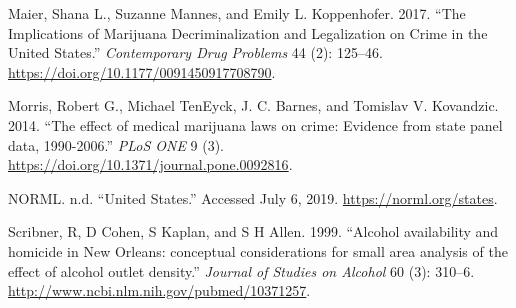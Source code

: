 \documentclass[11pt,]{article}
\begin{document}
\leavevmode\hypertarget{ref-Maier2017}{}%
Maier, Shana L., Suzanne Mannes, and Emily L. Koppenhofer. 2017. ``The
Implications of Marijuana Decriminalization and Legalization on Crime in
the United States.'' \emph{Contemporary Drug Problems} 44 (2): 125--46.
\url{https://doi.org/10.1177/0091450917708790}.

\leavevmode\hypertarget{ref-Morris2014}{}%
Morris, Robert G., Michael TenEyck, J. C. Barnes, and Tomislav V.
Kovandzic. 2014. ``The effect of medical marijuana laws on crime:
Evidence from state panel data, 1990-2006.'' \emph{PLoS ONE} 9 (3).
\url{https://doi.org/10.1371/journal.pone.0092816}.

\leavevmode\hypertarget{ref-NORML}{}%
NORML. n.d. ``United States.'' Accessed July 6, 2019.
\url{https://norml.org/states}.

\leavevmode\hypertarget{ref-Scribner1999}{}%
Scribner, R, D Cohen, S Kaplan, and S H Allen. 1999. ``Alcohol
availability and homicide in New Orleans: conceptual considerations for
small area analysis of the effect of alcohol outlet density.''
\emph{Journal of Studies on Alcohol} 60 (3): 310--6.
\url{http://www.ncbi.nlm.nih.gov/pubmed/10371257}.




\newpage
\singlespacing 
\end{document}
